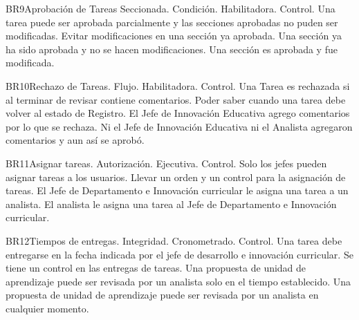\begin{BussinesRule}{BR9}{Aprobación de Tareas Seccionada.}
    \BRitem[Tipo:] Condición.
    \BRitem[Clase:] Habilitadora.
    \BRitem[Nivel:] Control.
    \BRitem[Descripción:]
    \BRitem[Sentencia:] Una tarea puede ser aprobada parcialmente y las secciones aprobadas no puden ser modificadas.
    \BRitem[Motivación:] Evitar modificaciones en una sección ya aprobada.
     Una sección ya ha sido aprobada y no se hacen modificaciones.
     Una sección es aprobada y fue modificada.
\end{BussinesRule}
\begin{BussinesRule}{BR10}{Rechazo de Tareas.}
    \BRitem[Tipo:] Flujo.
    \BRitem[Clase:] Habilitadora.
    \BRitem[Nivel:] Control.
    \BRitem[Descripción:] Una Tarea es rechazada si al terminar de revisar contiene comentarios.
    \BRitem[Motivación:] Poder saber cuando una tarea debe volver al estado de Registro.
     El Jefe de Innovación Educativa agrego comentarios por lo que se rechaza.
     Ni el Jefe de Innovación Educativa ni el Analista agregaron comentarios y aun así se aprobó.
\end{BussinesRule}
\begin{BussinesRule}{BR11}{Asignar tareas.}
    \BRitem[Tipo:] Autorización.
    \BRitem[Clase:] Ejecutiva.
    \BRitem[Nivel:] Control.
    \BRitem[Descripción:] Solo los jefes pueden asignar tareas a los usuarios.
    \BRitem[Sentencia:]
    \BRitem[Motivación:] Llevar un orden y un control para la asignación de tareas.
     El Jefe de Departamento e Innovación curricular le asigna una tarea a un analista.
     El analista le asigna una tarea al Jefe de Departamento e Innovación curricular.
\end{BussinesRule}
\begin{BussinesRule}{BR12}{Tiempos de entregas.}
    \BRitem[Tipo:] Integridad.
    \BRitem[Clase:] Cronometrado.
    \BRitem[Nivel:] Control.
    \BRitem[Descripción:] Una tarea debe entregarse en la fecha indicada por el jefe de desarrollo e innovación curricular.
    \BRitem[Motivación:] Se tiene un control en las entregas de tareas.
     Una propuesta de unidad de aprendizaje puede ser revisada por un analista solo en el tiempo establecido.
     Una propuesta de unidad de aprendizaje puede ser revisada por un analista en cualquier momento.
\end{BussinesRule}
